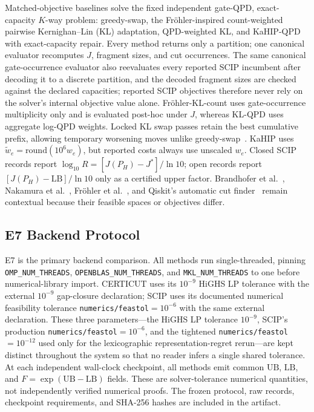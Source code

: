 \documentclass[11pt]{article}
\newcommand{\LB}{\mathrm{LB}}
\newcommand{\UB}{\mathrm{UB}}
\begin{document}
Matched-objective baselines solve the fixed independent gate-QPD, exact-capacity $K$-way problem: greedy-swap, the Fr{\"o}hler-inspired count-weighted pairwise Kernighan--Lin (KL) adaptation, QPD-weighted KL, and KaHIP-QPD with exact-capacity repair. Every method returns only a partition; one canonical evaluator recomputes $J$, fragment sizes, and cut occurrences. The same canonical gate-occurrence evaluator also reevaluates every reported SCIP incumbent after decoding it to a discrete partition, and the decoded fragment sizes are checked against the declared capacities; reported SCIP objectives therefore never rely on the solver's internal objective value alone. Fr{\"o}hler-KL-count uses gate-occurrence multiplicity only and is evaluated post-hoc under $J$, whereas KL-QPD uses aggregate log-QPD weights. Locked KL swap passes retain the best cumulative prefix, allowing temporary worsening moves unlike greedy-swap~\cite{kernighanlin1970}. KaHIP uses $\tilde w_e=\mathrm{round}(10^6w_e)$, but reported costs always use unscaled $w_e$. Closed SCIP records report $\log_{10}R=[J(P_H)-J^*]/\ln10$; open records report $[J(P_H)-\LB]/\ln10$ only as a certified upper factor. Brandhofer et al.~\cite{brandhofer2024}, Nakamura et al.~\cite{nakamura2025}, Fr{\"o}hler et al.~\cite{frohler2026}, and Qiskit's automatic cut finder~\cite{qiskitcutting} remain contextual because their feasible spaces or objectives differ.

\subsection{E7 Backend Protocol}

E7 is the primary backend comparison. All methods run single-threaded, pinning \texttt{OMP\_NUM\_THREADS}, \texttt{OPENBLAS\_NUM\_THREADS}, and \texttt{MKL\_NUM\_THREADS} to one before numerical-library import. CERTICUT uses its $10^{-9}$ HiGHS LP tolerance with the external $10^{-9}$ gap-closure declaration; SCIP uses its documented numerical feasibility tolerance \texttt{numerics/feastol}$=10^{-6}$ with the same external declaration. These three parameters---the HiGHS LP tolerance $10^{-9}$, SCIP's production \texttt{numerics/feastol}$=10^{-6}$, and the tightened \texttt{numerics/feastol}$=10^{-12}$ used only for the lexicographic representation-regret rerun---are kept distinct throughout the system so that no reader infers a single shared tolerance. At each independent wall-clock checkpoint, all methods emit common $\UB$, $\LB$, and $F=\exp(\UB-\LB)$ fields. These are solver-tolerance numerical quantities, not independently verified numerical proofs. The frozen protocol, raw records, checkpoint requirements, and SHA-256 hashes are included in the artifact.
\end{document}
